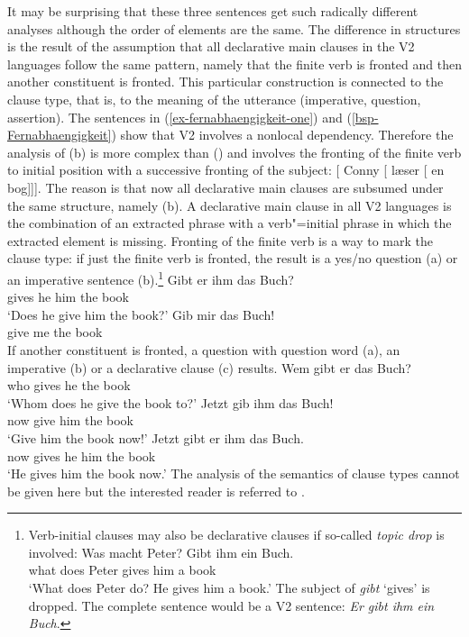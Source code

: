 \noindent
It may be surprising that these three sentences get such radically different analyses although the
order of elements are the same. The difference in structures is the result of the assumption that
all declarative main clauses in the  V2 languages follow the same pattern, namely that the
finite verb is fronted and then another constituent is fronted. This particular construction is
connected to the clause type, that is, to the meaning of the utterance (imperative, question,
assertion). The sentences in (\ref{ex-fernabhaengigkeit-one}) and (\ref{bsp-Fernabhaengigkeit}) show
that V2 involves a nonlocal dependency. Therefore the analysis
of (b) is more complex than () and involves the fronting of the finite verb to initial
position with a successive fronting of the subject:
\ea
{}[ Conny [ læser [ en bog]]].
\z
\largerpage
The reason is that now all declarative main clauses are subsumed under the same structure, namely
(b). A declarative main clause in all  V2 languages is the combination of an extracted
phrase with a verb"=initial phrase in which the extracted element is missing. Fronting of the finite
verb is a way to mark the clause type: if just the finite verb is fronted, the result is a yes/no question (a)
or an imperative sentence (b).\footnote{
  Verb-initial clauses may also be declarative clauses if so-called \emph{topic drop} \citep{Fries88b} is involved:
  \ea
  \gll Was macht Peter? Gibt ihm ein Buch.\\
       what does Peter  gives him a book\\\german
  \glt `What does Peter do? He gives him a book.'
  \z
  The subject of \emph{gibt} `gives' is dropped. The complete sentence would be a V2 sentence:
  \emph{Er gibt ihm ein Buch}.
}
\eal
\ex 
\gll Gibt er ihm das Buch?\\
     gives he him the book\\\german
\glt `Does he give him the book?'
\ex 
\gll Gib mir das Buch!\\
     give me the book\\
\zl
If another constituent is fronted, a question with question word (a), an imperative
(b) or a declarative clause (c) results.
\eal
\ex 
\gll Wem gibt er das Buch?\\
     who gives he the book\\\german
\glt `Whom does he give the book to?'
\ex 
\gll Jetzt gib ihm das Buch!\\
     now give him the book\\
\glt `Give him the book now!'
\ex 
\gll Jetzt gibt er ihm das Buch.\\
     now gives he him the book\\
\glt `He gives him the book now.'
\zl
The analysis of the semantics of clause types cannot be given here but the interested reader is
referred to .%

